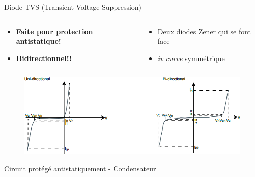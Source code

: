 \begin{frame}{Diode TVS (Transient Voltage Suppression)}
    \begin{columns}
        \begin{column}{0.5\textwidth}
            \begin{itemize}
                \item \textbf{Faite pour protection antistatique!}
                \item \textbf{Bidirectionnel!!}
            \end{itemize}
        \end{column}
        \begin{column}{0.5\textwidth}
            \begin{itemize}
                \item Deux diodes Zener qui se font face
                \item \textit{iv curve} symmétrique
            \end{itemize}
        \end{column}
    \end{columns}
    \begin{figure}
                \centering
                \includegraphics[width=\textwidth]{pictures/diode-tvs-iv-curve.png}
            \end{figure}
\end{frame}

\begin{frame}{Circuit protégé antistatiquement - Condensateur}
    \begin{center}
    \vspace{-24pt}
    \end{center}
\end{frame}


